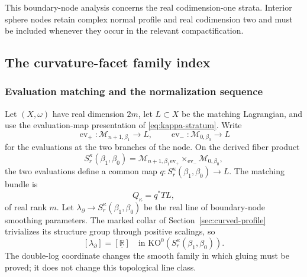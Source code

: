 \documentclass[11pt,letterpaper,twoside]{article}
\theoremstyle{plain}
\theoremstyle{definition}
\theoremstyle{remark}
\begin{document}
This boundary-node analysis concerns the real codimension-one strata.  Interior sphere nodes retain complex normal profile and real codimension two and must be included whenever they occur in the relevant compactification.

\subsection{The curvature-facet family index}\label{sec:curved-index}

\subsubsection{Evaluation matching and the normalization sequence}

Let \((X,\omega)\) have real dimension \(2m\), let \(L\subset X\) be the matching Lagrangian, and use the evaluation-map presentation of \eqref{eq:kappa-stratum}.  Write
\[
 \operatorname{ev}_+:\mathcal M_{n+1,\beta_1}\longrightarrow L,
 \qquad
 \operatorname{ev}_-:\mathcal M_{0,\beta_0}\longrightarrow L
\]
for the evaluations at the two branches of the node.  On the derived fiber product
\begin{equation}\label{eq:kappa-evaluation-fiber-product}
 S^\kappa_{r}(\beta_1,\beta_0)
 =\mathcal M_{n+1,\beta_1}
 {}_{\operatorname{ev}_+}\!\times_{\operatorname{ev}_-}
 \mathcal M_{0,\beta_0},
\end{equation}
the two evaluations define a common map \(q:S^\kappa_r(\beta_1,\beta_0)\to L\).  The matching bundle is
\begin{equation}\label{eq:kappa-matching-bundle}
 Q_\kappa=q^*TL,
\end{equation}
of real rank \(m\).  Let \(\lambda_\partial\to S^\kappa_r(\beta_1,\beta_0)\) be the real line of boundary-node smoothing parameters.  The marked collar of Section~\ref{sec:curved-profile} trivializes its structure group through positive scalings, so
\begin{equation}\label{eq:kappa-smoothing-line}
 [\lambda_\partial]=[\underline{\mathbb R}]
 \quad\text{in }\mathrm{KO}^0(S^\kappa_r(\beta_1,\beta_0)).
\end{equation}
The double-log coordinate changes the smooth family in which gluing must be proved; it does not change this topological line class.
\end{document}
